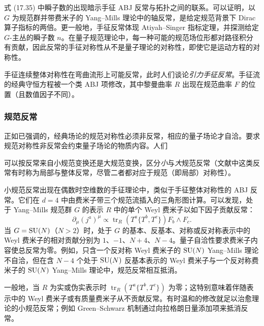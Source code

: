 
式 (17.35) 中瞬子数的出现暗示手征 ABJ 反常与拓扑之间的联系。可以证明，以 $G$ 为规范群并带费米子的 Yang--Mills 理论中的轴反常，是给定规范背景下 Dirac 算子指标的两倍。更一般地，手征反常体现 Atiyah--Singer 指标定理，并探测给定 $G$-主丛的瞬子数 $n$。在量子规范理论中，每一种可能的规范场位形都对路径积分有贡献，因此反常的手征对称性从不是量子理论的对称性，即使它是运动方程的对称性。

手征连续整体对称性在弯曲流形上可能反常，此时人们谈论\emph{引力手征反常}。手征流的经典守恒方程被一个类 ABJ 项修改，其中黎曼曲率 $R$ 出现在规范曲率 $F$ 的位置（且数值因子不同）。

\subsubsection*{规范反常}

正如已强调的，经典场论的规范对称性必须非反常，相应的量子场论才自洽。要求规范对称性非反常会约束量子场论的物质内容。人们

可以按反常来自小规范变换还是大规范变换，区分\emph{小}与\emph{大}规范反常（文献中这类反常有时称为局部与整体反常，尽管二者都对应于规范（即局部）对称性）。

\begin{proposition}[17.36]
小规范反常出现在偶数时空维数的手征理论中，类似于手征整体对称性的 ABJ 反常。它们在 $d=4$ 中由费米子带三个规范流插入的三角形图计算。可以发现，处于 Yang--Mills 规范群 $G$ 的表示 $R$ 中的单个 Weyl 费米子以如下因子贡献反常：
\[
\partial_\mu(j^a)^\mu\propto \operatorname{tr}_R(T^a\{T^b,T^c\})F_b\wedge F_c.
\]
当 $G=\operatorname{SU}(N)$（$N>2$）时，处于 $G$ 的基本、反基本、对称或反对称表示中的 Weyl 费米子的相对贡献分别为 $1$、$-1$、$N+4$、$N-4$。量子自洽性要求费米子内容使总反常为零。例如，只含一个反对称 Weyl 费米子的 $\operatorname{SU}(N)$ Yang--Mills 理论不自洽，但在含 $N-4$ 个处于 $\operatorname{SU}(N)$ 反基本表示的 Weyl 费米子与一个反对称费米子的 $\operatorname{SU}(N)$ Yang--Mills 理论中，规范反常相互抵消。
\end{proposition}

一般地，当 $R$ 为实或伪实表示时 $\operatorname{tr}_R(T^a\{T^b,T^c\})$ 为零；这特别意味着伴随表示中的 Weyl 费米子或有质量费米子从不贡献反常。有时温和的修改就足以治愈理论的小规范反常；例如 Green--Schwarz 机制通过向拉格朗日量添加项来抵消反常。

